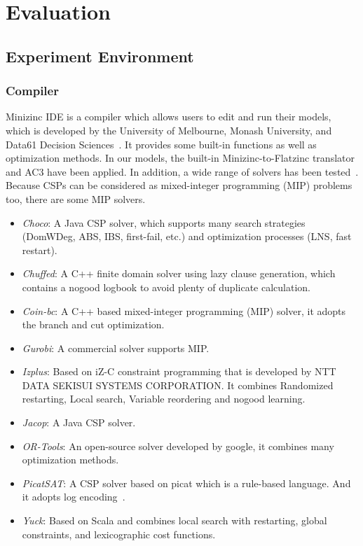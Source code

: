\chapter{Evaluation}
\label{cha:evaluation}
\section{Experiment Environment}
\subsection{Compiler}
\label{section:compiler}
Minizinc IDE is a compiler which allows users to edit and run their models, which is developed by the University of Melbourne, Monash University, and Data61 Decision Sciences~\cite{r6}. It provides some built-in functions as well as optimization methods. In our models, the built-in Minizinc-to-Flatzinc translator and AC3 have been applied. In addition, a wide range of solvers has been tested~\cite{r6}. Because CSPs can be considered as mixed-integer programming (MIP) problems too, there are some MIP solvers.
\begin{itemize}
    \item \emph{Choco}: A Java CSP solver, which supports many search strategies (DomWDeg, ABS, IBS, first-fail, etc.) and optimization processes (LNS, fast restart).
    \item \emph{Chuffed}: A C++ finite domain solver using lazy clause generation, which contains a nogood logbook to avoid plenty of duplicate calculation.
    \item \emph{Coin-bc}: A C++ based mixed-integer programming (MIP) solver, it adopts the branch and cut optimization.
    \item \emph{Gurobi}: A commercial solver supports MIP.
    \item \emph{Izplus}: Based on iZ-C constraint programming that is developed by NTT DATA SEKISUI SYSTEMS CORPORATION. It combines Randomized restarting, Local search, Variable reordering and nogood learning.
    \item \emph{Jacop}: A Java CSP solver.
    \item \emph{OR-Tools}: An open-source solver developed by google, it combines many optimization methods.
    \item \emph{PicatSAT}: A CSP solver based on picat which is a rule-based language. And it adopts log encoding~\cite{r8}.
    \item \emph{Yuck}: Based on Scala and combines local search with restarting, global constraints, and lexicographic cost functions.
\end{itemize}
